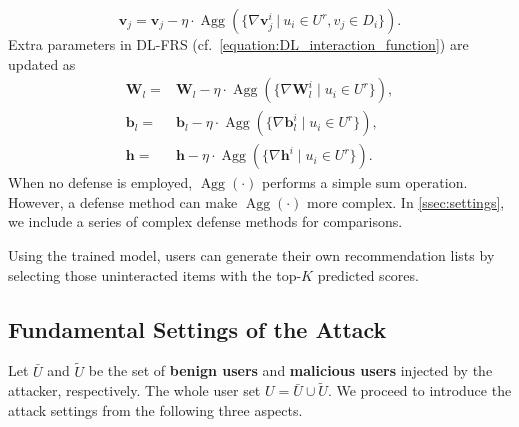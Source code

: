 \begin{enumerate}[leftmargin=*]
\begin{equation*}
\mathbf{v}_j = \mathbf{v}_j-\eta\cdot 
\operatorname{Agg}(\{\nabla\mathbf{v}_j^i\ |\ u_i\in{U}^r, v_j\in{D}_i\}).
\end{equation*}
Extra parameters in DL-FRS (cf.\ \cref{equation:DL_interaction_function}) are updated as
\begin{equation*}
\begin{aligned}
\mathbf{W}_l = & \mathbf{W}_l-\eta\cdot \operatorname{Agg}(\{\nabla\mathbf{W}_l^i \mid u_i\in{U}^r\}),\\
\mathbf{b}_l = & \mathbf{b}_l-\eta\cdot \operatorname{Agg}(\{\nabla\mathbf{b}_l^i \mid u_i\in{U}^r\}),\\
\mathbf{h} = & \mathbf{h}-\eta\cdot \operatorname{Agg}(\{\nabla\mathbf{h}^i \mid u_i\in{U}^r\}).
\end{aligned}
\end{equation*}
When no defense is employed, $\operatorname{Agg}(\cdot)$ performs a simple sum operation. However, a defense method can make $\operatorname{Agg}(\cdot)$ more complex.
In %
\cref{ssec:settings}, we include a series of complex defense methods for comparisons.
\end{enumerate}

Using the trained model, users can generate their own recommendation lists by selecting those uninteracted items with the top-$K$ predicted scores.

\subsection{Fundamental Settings of the Attack}
\label{ssec:setting-attack}

Let $\bar{{U}}$ and $\tilde{{U}}$ be the set of \textbf{benign users} and \textbf{malicious users} injected by the attacker, respectively.
The whole user set ${U}=\bar{{U}}\cup\tilde{{U}}$.
We proceed to introduce the attack settings from the following three aspects. 

